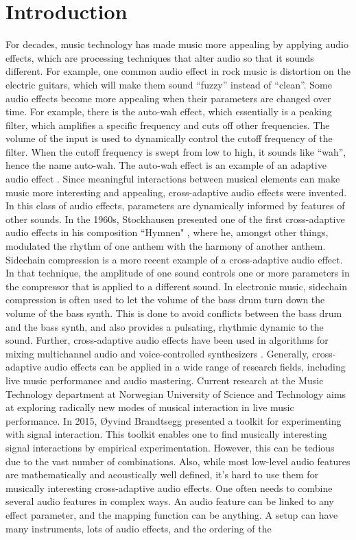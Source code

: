 \chapter{Introduction}
For decades, music technology has made music more appealing by applying audio effects, which are processing techniques that alter audio so that it sounds different. For example, one common audio effect in rock music is distortion on the electric guitars, which will make them sound “fuzzy” instead of “clean”. Some audio effects become more appealing when their parameters are changed over time. For example, there is the auto-wah effect, which essentially is a peaking filter, which amplifies a specific frequency and cuts off other frequencies. The volume of the input is used to dynamically control the cutoff frequency of the filter. When the cutoff frequency is swept from low to high, it sounds like “wah”, hence the name auto-wah. The auto-wah effect is an example of an adaptive audio effect \citep{verfaille2006}. Since meaningful interactions between musical elements can make music more interesting and appealing, cross-adaptive audio effects were invented. In this class of audio effects, parameters are dynamically informed by features of other sounds. In the 1960s, Stockhausen presented one of the first cross-adaptive audio effects in his composition ``Hymnen" \citep{moritz2003}, where he, amongst other things, modulated the rhythm of one anthem with the harmony of another anthem. Sidechain compression is a more recent example of a cross-adaptive audio effect. In that technique, the amplitude of one sound controls one or more parameters in the compressor that is applied to a different sound. In electronic music, sidechain compression is often used to let the volume of the bass drum turn down the volume of the bass synth. This is done to avoid conflicts between the bass drum and the bass synth, and also provides a pulsating, rhythmic dynamic to the sound. Further, cross-adaptive audio effects have been used in algorithms for mixing multichannel audio \citep{reiss2011} and voice-controlled synthesizers \citep{cartwright2014}. Generally, cross-adaptive audio effects can be applied in a wide range of research fields, including live music performance and audio mastering. Current research at the Music Technology department at Norwegian University of Science and Technology aims at exploring radically new modes of musical interaction in live music performance. In 2015, Øyvind Brandtsegg presented a toolkit for experimenting with signal interaction. This toolkit enables one to find musically interesting signal interactions by empirical experimentation. However, this can be tedious due to the vast number of combinations. Also, while most low-level audio features are mathematically and acoustically well defined, it's hard to use them for musically interesting cross-adaptive audio effects. One often needs to combine several audio features in complex ways. An audio feature can be linked to any effect parameter, and the mapping function can be anything. A setup can have many instruments, lots of audio effects, and the ordering of the 